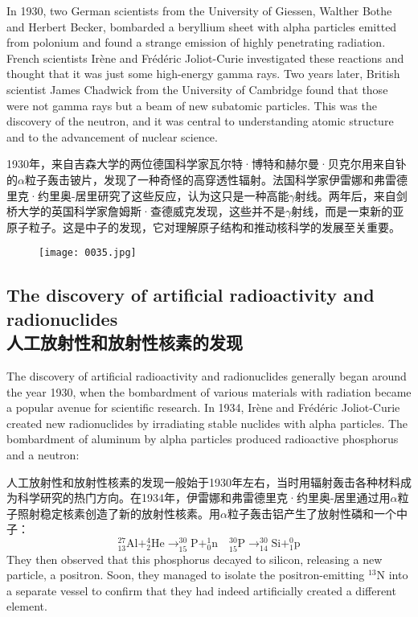 \documentclass[dvipsnames, svgnames,a4paper,11pt]{article}
\begin{document}
In 1930, two German scientists from the University of Giessen, Walther Bothe and Herbert Becker, bombarded a beryllium sheet with alpha particles emitted from polonium and found a strange emission of highly penetrating radiation. French scientists Irène and Frédéric Joliot-Curie investigated these reactions and thought that it was just some high-energy gamma rays. Two years later, British scientist James Chadwick from the University of Cambridge found that those were not gamma rays but a beam of new subatomic particles. This was the discovery of the neutron, and it was central to understanding atomic structure and to the advancement of nuclear science.

1930年，来自吉森大学的两位德国科学家瓦尔特·博特和赫尔曼·贝克尔用来自钋的$\alpha$粒子轰击铍片，发现了一种奇怪的高穿透性辐射。法国科学家伊雷娜和弗雷德里克·约里奥-居里研究了这些反应，认为这只是一种高能$\gamma$射线。两年后，来自剑桥大学的英国科学家詹姆斯·查德威克发现，这些并不是$\gamma$射线，而是一束新的亚原子粒子。这是中子的发现，它对理解原子结构和推动核科学的发展至关重要。

\begin{figure}[htbp]
      \centering
      \texttt{[image: 0035.jpg]}
       \label{fig24}
\end{figure}

\subsection{The discovery of artificial radioactivity and radionuclides\\人工放射性和放射性核素的发现}

The discovery of artificial radioactivity and radionuclides generally began around the year 1930, when the bombardment of various materials with radiation became a popular avenue for scientific research. In 1934, Irène and Frédéric Joliot-Curie created new radionuclides by irradiating stable nuclides with alpha particles. The bombardment of aluminum by alpha particles produced radioactive phosphorus and a neutron:

人工放射性和放射性核素的发现一般始于1930年左右，当时用辐射轰击各种材料成为科学研究的热门方向。在1934年，伊雷娜和弗雷德里克·约里奥-居里通过用$\alpha$粒子照射稳定核素创造了新的放射性核素。用$\alpha$粒子轰击铝产生了放射性磷和一个中子：
$$\mathrm{_{13}^{27}Al+_2^4He\to_{15}^{30}P+_0^1n \quad _{15}^{30}P\to_{14}^{30}Si+_1^0p}$$
They then observed that this phosphorus decayed to silicon, releasing a new particle, a positron. Soon, they managed to isolate the positron-emitting  ${}^{13}$N into a separate vessel to confirm that they had indeed artificially created a different element.
\end{document}
